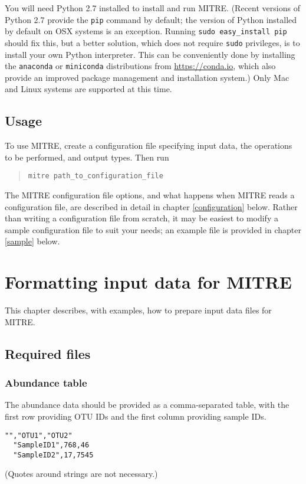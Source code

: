 \documentclass[12pt]{report}
\begin{document}
You will need Python 2.7 installed to install and run MITRE. (Recent
versions of Python 2.7 provide the \texttt{pip} command by default;
the version of Python installed by default on OSX systems is an
exception. Running \texttt{sudo easy\_install pip} should fix this,
but a better solution, which does not require \texttt{sudo}
privileges, is to install your own Python interpreter. This can be
conveniently done by installing the \texttt{anaconda} or
\texttt{miniconda} distributions from \url{https://conda.io}, which
also provide an improved package management and installation system.)
Only Mac and Linux systems are supported at this time.

\section{Usage}
To use MITRE, create a configuration file specifying input data, the
operations to be performed, and output types. Then run \begin{quote} \texttt{mitre
  path\_to\_configuration\_file} \end{quote} The MITRE configuration file
options, and what happens when MITRE reads a configuration file, are
described in detail in chapter \ref{configuration} below. Rather than
writing a configuration file from scratch, it may be easiest to modify
a sample configuration file to suit your needs; an example file is
provided in chapter \ref{sample} below.


\chapter{Formatting input data for MITRE}
This chapter describes, with examples, how to prepare input data files
for MITRE.

\section{Required files}
\subsection{Abundance table}\label{abundance_data}
The abundance data should be provided as a comma-separated table,
with the first row providing OTU IDs and the first column providing
sample IDs. 
\begin{lstlisting}[caption=Example abundance data table]
  "","OTU1","OTU2"
  "SampleID1",768,46
  "SampleID2",17,7545
\end{lstlisting}
(Quotes around strings are not necessary.)
\end{document}

